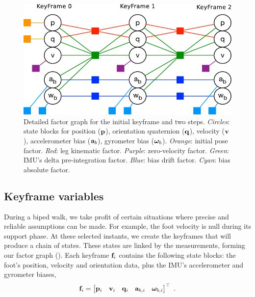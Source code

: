 \begin{figure}[tb]
\centering
\includegraphics[scale=0.65]{figures/graph_exploded}
\caption{
Detailed factor graph for the initial keyframe and two steps. 
\emph{Circles}: state blocks for position (${\bf p}$), orientation quaternion (${\bf q}$), velocity (${\bf v}$), accelerometer bias (${\bf a}_b$), gyrometer bias (${{\bm \omega}}_b$). 
\emph{Orange}: initial pose factor. 
\emph{Red}: leg kinematic factor. 
\emph{Purple}: zero-velocity factor. 
\emph{Green}: IMU's delta pre-integration factor. 
\emph{Blue}: bias drift factor. 
\emph{Cyan}: bias absolute factor. 
}
\label{fig:factor_graph}
\end{figure}




\subsection{Keyframe variables}

During a biped walk, we take profit of certain situations where precise and reliable assumptions can be made. For example, the  foot velocity is null during its support phase. At these selected instants, we create the keyframes that will produce a chain of states. These states are linked by the measurements, forming our factor graph (). Each keyframe ${\bf f}_i$ contains the following state blocks: the foot's position, velocity and orientation data, plus the IMU's accelerometer and gyrometer biases,
%
\begin{align}
{\bf f}_i = \begin{bmatrix}
{\bf p}_i & {\bf v}_i & {\bf q}_i & {\bf a}_{b,i} & {{\bm \omega}}_{b,i}
\end{bmatrix}^{\top}
~.
\end{align}
%


